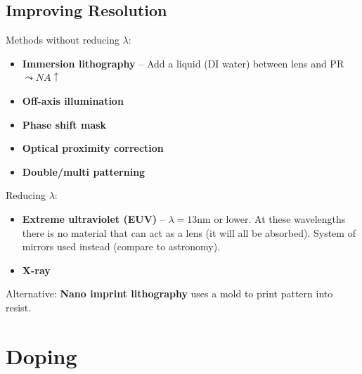 \documentclass[6pt,letterpaper]{scrartcl}
\newcommand\NA{\mathit{NA}}
\begin{document}
\begin{multicols}{3}
\subsection{Improving Resolution}
Methods without reducing $\lambda$:
\begin{itemize}
	\item \textbf{Immersion lithography} -- Add a liquid (DI water) between lens and PR $\leadsto \NA \uparrow$
	\item \textbf{Off-axis illumination}
	\item \textbf{Phase shift mask}
	\item \textbf{Optical proximity correction}
	\item \textbf{Double/multi patterning}
\end{itemize}
Reducing $\lambda$:
\begin{itemize}
	\item \textbf{Extreme ultraviolet (EUV)} -- $\lambda = 13\mathrm{nm}$ or lower. At these wavelengths there is no material that can act as a lens (it will all be absorbed). System of mirrors used instead (compare to astronomy).
	\item \textbf{X-ray}
\end{itemize}
Alternative: \textbf{Nano imprint lithography} uses a mold to print pattern into resist.
\section{Doping}

\end{multicols}
\end{document}
